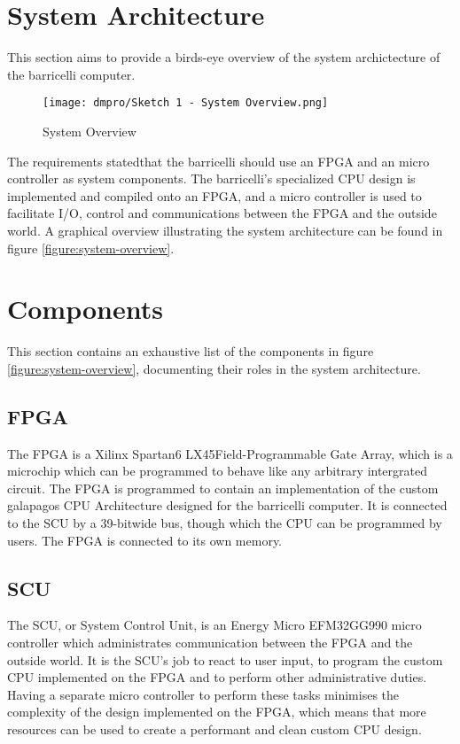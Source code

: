 \section{System Architecture}

This section aims to provide a birds-eye overview of the system archictecture of the \Gls{barricelli} computer.

\begin{figure}[H]
\texttt{[image: dmpro/Sketch 1 - System Overview.png]}
\caption{System Overview}
\label{figure:system-overview}
\end{figure}

The requirements stated\cn that the \Gls{barricelli} should use an FPGA and an micro controller as system components.
The \Gls{barricelli}'s specialized CPU design is implemented and compiled onto an FPGA, and a micro controller is used to facilitate I/O, control and communications between the FPGA and the outside world.
A graphical overview illustrating the system architecture can be found in figure \vref{figure:system-overview}.

\section{Components}

This section contains an exhaustive list of the components in figure \vref{figure:system-overview}, documenting their roles in the system architecture.

\subsection{FPGA}

The FPGA is a Xilinx Spartan6 LX45\cn Field-Programmable Gate Array, which is a microchip which can be programmed to behave like any arbitrary intergrated circuit.
The FPGA is programmed to contain an implementation of the custom \Gls{galapagos} CPU Architecture designed for the \Gls{barricelli} computer.
It is connected to the SCU by a 39-bit\cn wide bus, though which the CPU can be programmed by users.
The FPGA is connected to its own memory.

\subsection{SCU}

The SCU, or System Control Unit, is an Energy Micro EFM32GG990 micro controller which administrates communication between the FPGA and the outside world.
It is the SCU's job to react to user input, to program the custom CPU implemented on the FPGA and to perform other administrative duties.
Having a separate micro controller to perform these tasks minimises the complexity of the design implemented on the FPGA, which means that more resources can be used to create a performant and clean custom CPU design.

